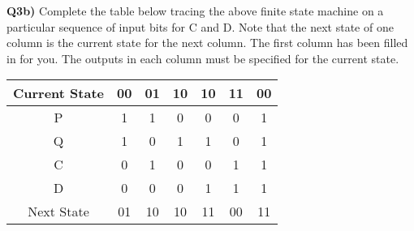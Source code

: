 \documentclass[12pt]{article}
\begin{document}
\begin{adjustwidth}{0em}{0pt}
\textbf{Q3b)} Complete the table below tracing the above finite state machine on a particular sequence of input bits for C and D. Note that the next state of one column is the current state for the next column. The first column has been filled in for you. The outputs in each column must be specified for the current
state. \\
\begin{center}
\begin{tabular}{| c || c | c | c | c | c | c |} 
 \hline
 Current State & 00 & 01 & 10 & 10 & 11 & 00 \\ [0.5ex] 
 \hline
 P & 1 & 1 & 0 & 0 & 0 & 1\\ 
 \hline
 Q & 1 & 0 & 1 & 1 & 0 & 1\\ 
 \hline
 C & 0 & 1 & 0 & 0 & 1 & 1\\ 
 \hline
 D & 0 & 0 & 0 & 1 & 1 & 1\\ 
 \hline\hline
 Next State & 01 & 10 & 10 & 11 & 00 & 11\\ 
 \hline
\end{tabular}
\end{center}
\end{adjustwidth}
\end{document}
